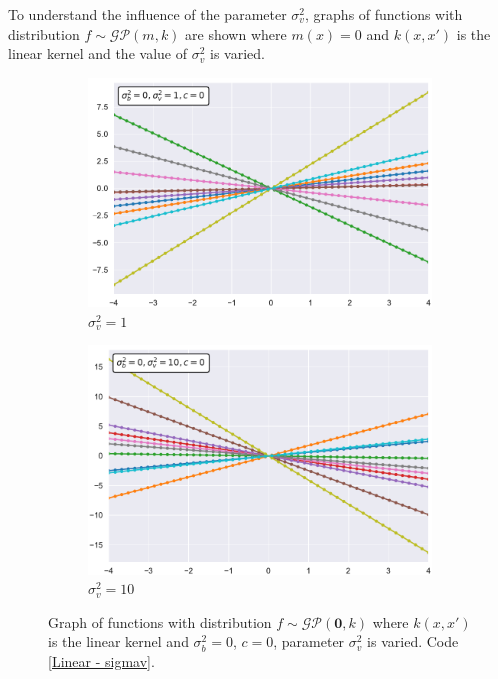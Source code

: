 \newpage

To understand the influence of the parameter $\sigma_v^2$, graphs of functions with distribution $f\sim \mathcal{GP}(m,k)$ are shown where $m(x)=0$ and $k(x,x')$ is the linear kernel and the value of $\sigma_v^2$ is varied.


\begin{figure}[h]
\centering
\begin{subfigure}{.5\textwidth}
  \centering
  \includegraphics[width=\linewidth]{images/Gaussian process/Linear - sigmav=1.pdf}
  \caption{$\sigma_v^2=1$}
\end{subfigure}%
\begin{subfigure}{.5\textwidth}
  \centering
  \includegraphics[width=\linewidth]{images/Gaussian process/Linear - sigmav=10.pdf}
  \caption{$\sigma_v^2=10$}
\end{subfigure}
\caption{Graph of functions with distribution $f\sim \mathcal{GP}(\bm{0},k)$ where $k(x,x')$ is the linear kernel and $\sigma_b^2=0$, $c=0$, parameter $\sigma_v^2$ is varied. Code \ref{Linear - sigmav}.}
\label{10 sample linear modified sigmav}
\end{figure}

